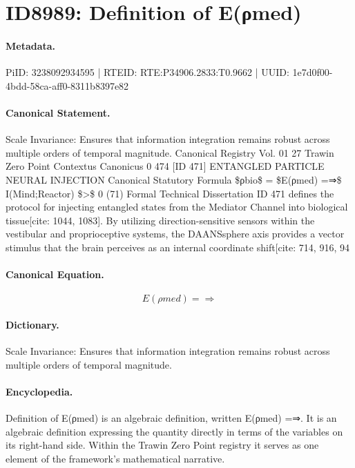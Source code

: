 \section*{ID8989: Definition of E(ρmed)}
\paragraph{Metadata.}
PiID: 3238092934595 | RTEID: RTE:P34906.2833:T0.9662 | UUID: 1e7d0f00-4bdd-58ca-aff0-8311b8397e82

\paragraph{Canonical Statement.}
Scale Invariance: Ensures that information integration remains robust across multiple orders of temporal magnitude. Canonical Registry Vol. 01 27 Trawin Zero Point Contextus Canonicus 0 474 [ID 471] ENTANGLED PARTICLE NEURAL INJECTION Canonical Statutory Formula \$ρbio\$ = \$E(ρmed) =⇒\$ I(Mind;Reactor) \$>\$ 0 (71) Formal Technical Dissertation ID 471 defines the protocol for injecting entangled states from the Mediator Channel into biological tissue[cite: 1044, 1083]. By utilizing direction-sensitive sensors within the vestibular and proprioceptive systems, the DAANSsphere axis provides a vector stimulus that the brain perceives as an internal coordinate shift[cite: 714, 916, 94

\paragraph{Canonical Equation.}
\[
E(ρmed) =⇒
\]

\paragraph{Dictionary.}
Scale Invariance: Ensures that information integration remains robust across multiple orders of temporal magnitude.

\paragraph{Encyclopedia.}
Definition of E(ρmed) is an algebraic definition, written E(ρmed) =⇒. It is an algebraic definition expressing the quantity directly in terms of the variables on its right-hand side. Within the Trawin Zero Point registry it serves as one element of the framework's mathematical narrative.
